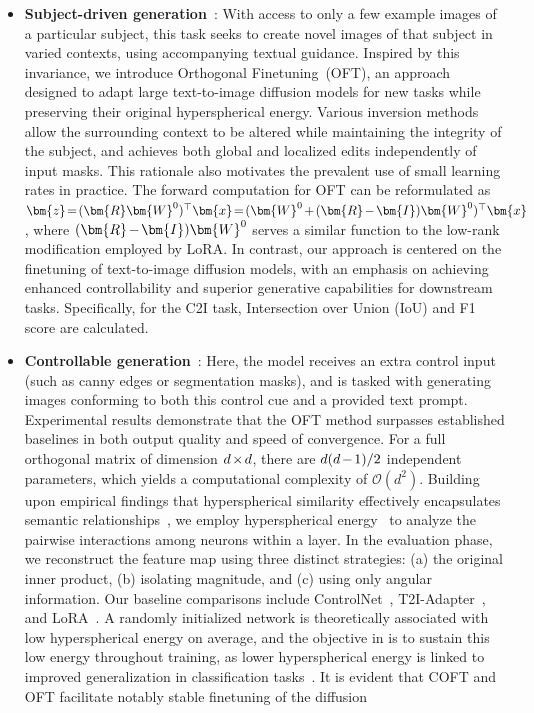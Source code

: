 \begin{itemize}[leftmargin=*,nosep]

    \item \textbf{Subject-driven generation}~\cite{ruiz2023dreambooth}: With access to only a few example images of a particular subject, this task seeks to create novel images of that subject in varied contexts, using accompanying textual guidance. Inspired by this invariance, we introduce Orthogonal Finetuning~(OFT), an approach designed to adapt large text-to-image diffusion models for new tasks while preserving their original hyperspherical energy. Various inversion methods~\cite{choi2021ilvr,dhariwal2021diffusion,ramesh2022hierarchical,gal2022image} allow the surrounding context to be altered while maintaining the integrity of the subject, and \cite{hertz2022prompt} achieves both global and localized edits independently of input masks. This rationale also motivates the prevalent use of small learning rates in practice. The forward computation for OFT can be reformulated as $\thickmuskip=2mu \medmuskip=2mu \bm{z}=(\bm{R}\bm{W}^0)^\top\bm{x}=(\bm{W}^0+(\bm{R}-\bm{I})\bm{W}^0)^\top\bm{x}$, where $\thickmuskip=2mu \medmuskip=2mu (\bm{R}-\bm{I})\bm{W}^0$ serves a similar function to the low-rank modification employed by LoRA. In contrast, our approach is centered on the finetuning of text-to-image diffusion models, with an emphasis on achieving enhanced controllability and superior generative capabilities for downstream tasks. Specifically, for the C2I task, Intersection over Union (IoU) and F1 score are calculated. \item \textbf{Controllable generation}~\cite{zhang2023adding,mou2023t2i}: Here, the model receives an extra control input (such as canny edges or segmentation masks), and is tasked with generating images conforming to both this control cue and a provided text prompt. Experimental results demonstrate that the OFT method surpasses established baselines in both output quality and speed of convergence. For a full orthogonal matrix of dimension $\thickmuskip=2mu \medmuskip=2mu d\times d$, there are $\thickmuskip=2mu \medmuskip=2mu d(d-1)/2$ independent parameters, which yields a computational complexity of $\mathcal{O}(d^2)$. Building upon empirical findings that hyperspherical similarity effectively encapsulates semantic relationships~\cite{liu2017deep,liu2018decoupled,chen2020angular}, we employ hyperspherical energy~\cite{liu2018learning} to analyze the pairwise interactions among neurons within a layer. In the evaluation phase, we reconstruct the feature map using three distinct strategies: (a) the original inner product, (b) isolating magnitude, and (c) using only angular information. Our baseline comparisons include ControlNet~\cite{zhang2023adding}, T2I-Adapter~\cite{mou2023t2i}, and LoRA~\cite{hulora2022}. A randomly initialized network is theoretically associated with low hyperspherical energy on average, and the objective in \cite{liu2021orthogonal} is to sustain this low energy throughout training, as lower hyperspherical energy is linked to improved generalization in classification tasks~\cite{liu2018learning,lin2020regularizing}. It is evident that COFT and OFT facilitate notably stable finetuning of the diffusion 
\end{itemize}
